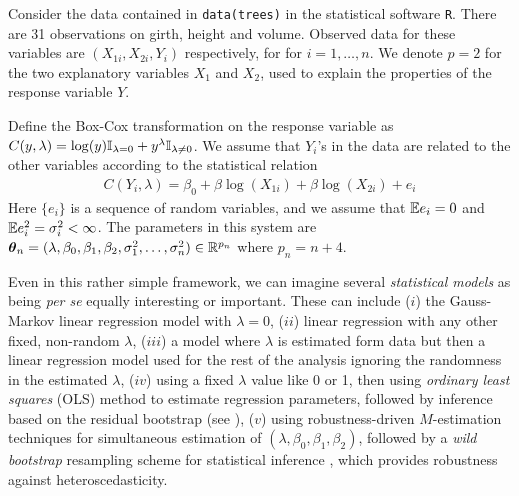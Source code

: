\begin{Example}\label{Example:Tree}

Consider the data contained in \verb#data(trees)# in the statistical software {\tt R}. There are 31 observations on girth, height and volume. Observed data for these variables are $(X_{1i}, X_{2i}, Y_{i})$ respectively, for for $i =1, \ldots, n$.
We denote $p =2$ for the two explanatory variables $X_{1}$ and $X_{2}$, used to explain the properties of the response variable $Y$.

Define the Box-Cox transformation \citep{BoxCox64} on the response variable  as $C(y, \lambda) = \log(y) {\mathbb{I}}_{\lambda = 0} + y^{\lambda}{\mathbb{I}}_{\lambda \ne 0}  $. We assume that $Y_{i}$'s  in the data are related to the other variables according to the statistical relation 
%
\begin{align}\label{eq:TreeModel}
C(Y_{i}, \lambda) = \beta_{0} + \beta \log(X_{1i}) +  \beta \log(X_{2i}) + e_{i}
\end{align}
%
Here $\{ e_{i} \}$ is a sequence of random variables, and we  assume that ${\mathbb{E}} e_{i} = 0$ and ${\mathbb{E}} e_{i}^{2} = \sigma_{i}^{2} < \infty$. The parameters in this system are ${\boldsymbol{\theta}}_n = (\lambda, \beta_{0}, \beta_{1}, \beta_{2}, \sigma_{1}^{2}, \ldots, \sigma_{n}^{2}) \in {\mathbb{R}}^{p_{n}}$ where  $p_{n} = n + 4$.
\end{Example}

Even in this rather simple framework, we can imagine several {\textit{statistical models}} as being 
{\textit{per se}} equally interesting or important. These can include ($i$) the Gauss-Markov linear regression model with $\lambda =0$, ($ii$) linear regression with any other fixed, non-random $\lambda$, ($iii$) a model where $\lambda$ is estimated form data but then a linear regression model used for the rest of the analysis ignoring the randomness in the estimated $\lambda$, ($iv$) using a fixed $\lambda$ value like 
0 or 1, then using {\textit{ordinary least squares}} (OLS) method to estimate regression parameters, followed by inference based on the residual bootstrap (see \cite{Efron79,EfronTibshiraniBook93,ShaoTuBook95}), ($v$) using robustness-driven $M$-estimation techniques for simultaneous estimation of 
$ (\lambda, \beta_{0}, \beta_{1}, \beta_{2})$, followed by a {\textit {wild bootstrap}} resampling scheme for statistical inference \citep{wu1986,Mammen93}, which provides robustness against heteroscedasticity.

